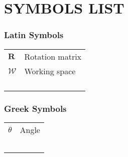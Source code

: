 
\chapter*{SYMBOLS LIST}

\subsection*{Latin Symbols}

\begin{tabular}{>{\centering}p{}l}
$\mathbf{R}$ & Rotation matrix\tabularnewline
$\mathcal{W}$ & Working space\tabularnewline
 & \tabularnewline
 & \tabularnewline
 & \tabularnewline
 & \tabularnewline
\end{tabular}

\subsection*{Greek Symbols}

\begin{tabular}{>{\centering}p{}l}
$\theta$ & Angle\tabularnewline
 & \tabularnewline
 & \tabularnewline
 & \tabularnewline
 & \tabularnewline
 & \tabularnewline
\end{tabular}
